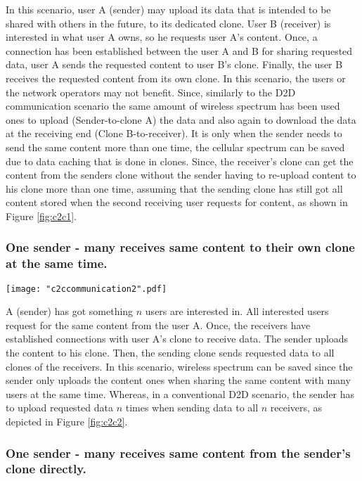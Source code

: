 \documentclass[12pt,journal,compsoc, onecolumn]{IEEEtran}
\begin{document}
In this scenario, user A (sender) may upload its data that is intended to be shared with others in the future, to its dedicated clone. User B (receiver) is interested in what user A owns, so he requests user A's content. Once, a connection has been established between the user A and B for sharing requested data, user A sends the requested content to user B's clone. Finally, the user B receives the requested content from its own clone. In this scenario, the users or the network operators may not benefit. Since, similarly to the D2D communication scenario the same amount of wireless spectrum has been used ones to upload (Sender-to-clone A) the data and also again to download the data at the receiving end (Clone B-to-receiver). It is only when the sender needs to send the same content more than one time, the cellular spectrum can be saved due to data caching that is done in clones. Since, the receiver's clone can get the content from the senders clone without the sender having to re-upload content to his clone more than one time, assuming that the sending clone has still got all content stored when the second receiving user requests for content, as shown in Figure \ref{fig:c2c1}.

\subsubsection*{One sender - many receives same content to their own clone at the same time.}

\begin{figure*}[ht]
\centering
\texttt{[image: "c2ccommunication2".pdf]}
\caption{\label{fig:c2c2} C2C: One sender - many receives same content to their own clone at the same time.}
\end{figure*} 

A (sender) has got something $n$ users are interested in. All interested users request for the same content from the user A. Once, the receivers have established connections with user A's clone to receive data. The sender uploads the content to his clone. Then, the sending clone sends requested data to all clones of the receivers. In this scenario, wireless spectrum can be saved since the sender only uploads the content ones when sharing the same content with many users at the same time. Whereas, in a conventional D2D scenario, the sender has to upload requested data $n$ times when sending data to all $n$ receivers, as depicted in Figure \ref{fig:c2c2}.

\subsubsection*{One sender - many receives same content from the sender's clone directly.}
\end{document}

